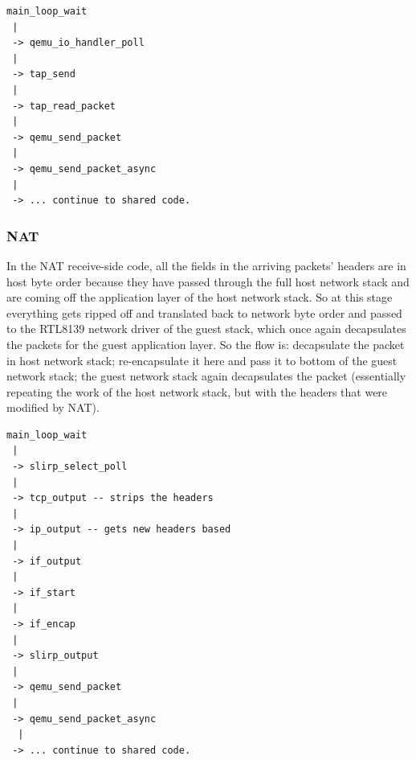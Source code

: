 \documentclass[letterpaper,twocolumn,11pt]{article}
\begin{document}
\begin{verbatim}
main_loop_wait
 |
 -> qemu_io_handler_poll
 |
 -> tap_send
 |
 -> tap_read_packet
 |
 -> qemu_send_packet
 |
 -> qemu_send_packet_async
 |
 -> ... continue to shared code. 
\end{verbatim}

\subsubsection*{NAT}
In the NAT receive-side code, all the fields in the arriving packets' headers are in host byte order because they have passed through the full host network stack and are coming off the application layer of the host network stack. So at this stage everything gets ripped off and translated back to network byte order and passed to the RTL8139 network driver of the guest stack, which once again decapsulates the packets for the guest application layer. So the flow is: decapsulate the packet in host network stack; re-encapsulate it here and pass it to bottom of the guest network stack; the guest network stack again decapsulates the packet (essentially repeating the work of the host network stack, but with the headers that were modified by NAT). 

\begin{verbatim}
main_loop_wait
 |
 -> slirp_select_poll
 |
 -> tcp_output -- strips the headers
 |
 -> ip_output -- gets new headers based 
 |
 -> if_output
 |
 -> if_start
 |
 -> if_encap
 |
 -> slirp_output
 |
 -> qemu_send_packet
 |
 -> qemu_send_packet_async
  |
 -> ... continue to shared code.
\end{verbatim}
\end{document}
